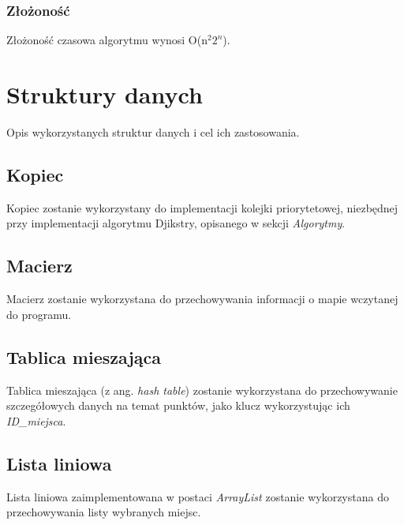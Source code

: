 \documentclass{article}
\begin{document}
\subsubsection{Złożoność}
    Złożoność czasowa algorytmu wynosi O(n$^{2}2^{n}$).


\section{Struktury danych}
Opis wykorzystanych struktur danych i cel ich zastosowania.

\subsection{Kopiec}
    Kopiec zostanie wykorzystany do implementacji kolejki priorytetowej, niezbędnej przy implementacji algorytmu Djikstry, opisanego w sekcji \textit{Algorytmy}.
    
\subsection{Macierz}
    Macierz zostanie wykorzystana do przechowywania informacji o mapie wczytanej do programu.
    
\subsection{Tablica mieszająca}
    Tablica mieszająca (z ang. \textit{hash table}) zostanie wykorzystana do przechowywanie szczegółowych danych na temat punktów, jako klucz wykorzystując ich \textit{ID\_miejsca}.

\subsection{Lista liniowa}
    Lista liniowa zaimplementowana w postaci \textit{ArrayList} zostanie wykorzystana do przechowywania listy wybranych miejsc.
\end{document}
